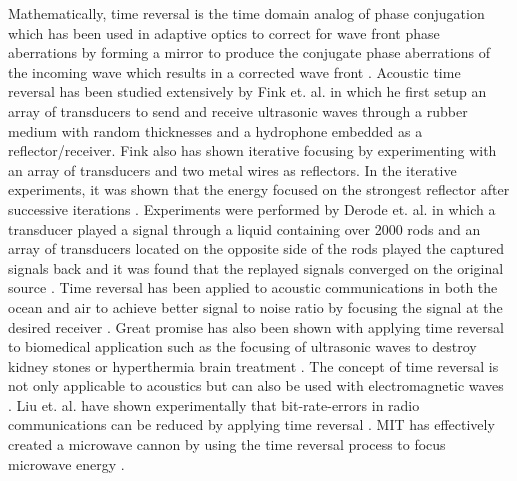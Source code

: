 Mathematically, time reversal is the time domain analog of phase conjugation which has been used in adaptive optics to correct for wave front phase aberrations by forming a mirror to produce the conjugate phase aberrations of the incoming wave which results in a corrected wave front \cite{Pepper1982}. Acoustic time reversal has been studied extensively by Fink et. al. in which he first setup an array of transducers to send and receive ultrasonic waves through a rubber medium with random thicknesses and a hydrophone embedded as a reflector/receiver.  Fink also has shown iterative focusing by experimenting with an array of transducers and two metal wires as reflectors. In the iterative experiments, it was shown that the energy focused on the strongest reflector after successive iterations \cite{Fink1993}. Experiments were performed by Derode et. al. in which a transducer played a signal through a liquid containing over 2000 rods and an array of transducers located on the opposite side of the rods played the captured signals back and it was found that the replayed signals converged on the original source \cite{Derode1995}. Time reversal has been applied to acoustic communications in both the ocean and air to achieve better signal to noise ratio by focusing the signal at the desired receiver \cite{Smith2003, Song2012, Shimura2012}. Great promise has also been shown with applying time reversal to biomedical application such as the focusing of ultrasonic waves to destroy kidney stones or hyperthermia brain treatment \cite{Fink2003}. The concept of time reversal is not only applicable to acoustics but can also be used with electromagnetic waves \cite{Lerosey2004}. Liu et. al. have shown experimentally that bit-rate-errors in radio communications can be reduced by applying time reversal \cite{Liu2008}. MIT has effectively created a microwave cannon by using the time reversal process to focus microwave energy \cite{Davy2010}.


